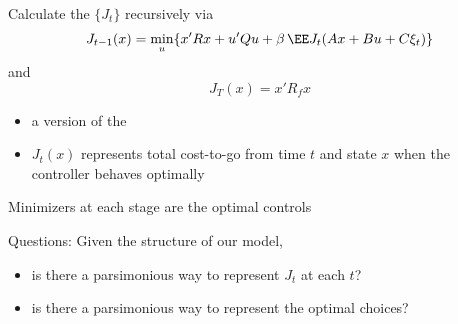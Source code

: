 \begin{frame}

    Calculate the  $\{J_t\}$ recursively via
    \begin{equation*}
        J_{t-1} (x)
        = \min_u
        \{
        x' R x + u' Q u + \beta \,
        \EE J_{t}(Ax + B u + C \xi_t)
        \}
    \end{equation*}
    and 
    \begin{equation*}
        J_T(x) = x' R_f x
    \end{equation*}

        \vspace{0.5em}
    \begin{itemize}
        \item a version of the 
        \vspace{0.5em}
        \item $J_t(x)$ represents total cost-to-go from time $t$ and state $x$ when the controller behaves optimally
    \end{itemize}


        \vspace{0.5em}
    Minimizers at each stage are the optimal controls

\end{frame}

\begin{frame}
    
    Questions:  Given the structure of our model,
    \begin{itemize}
        \item is there a parsimonious way to represent $J_t$ at each $t$?
        \vspace{0.5em}
        \item is there a parsimonious way to represent the optimal choices?
    \end{itemize}

\end{frame}


